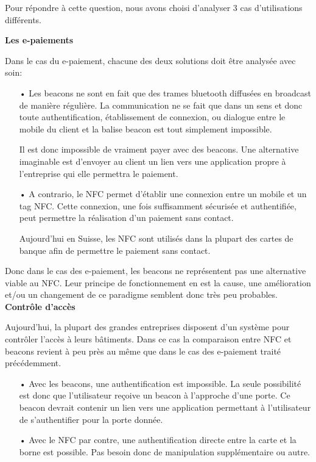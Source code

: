 \documentclass[12pt]{article}
\begin{document}
Pour répondre à cette question, nous avons choisi d'analyser 3 cas d'utilisations différents.

\textbf{Les e-paiements}\label{epaiement}
\medskip

Dans le cas du e-paiement, chacune des deux solutions doit être analysée avec soin:

\begin{enumerate}
\item[•] Les beacons ne sont en fait que des trames bluetooth diffusées en broadcast de manière régulière. La communication ne se fait que dans un sens et donc toute authentification, établissement de connexion, ou dialogue entre le mobile du client et la balise beacon est tout simplement impossible.

Il est donc impossible de vraiment payer avec des beacons. Une alternative imaginable est d'envoyer au client un lien vers une application propre à l'entreprise qui elle permettra le paiement. 

\item[•] A contrario, le NFC permet d'établir une connexion entre un mobile et un tag NFC. Cette connexion, une fois suffisamment sécurisée et authentifiée, peut permettre la réalisation d'un paiement sans contact. 

Aujourd'hui en Suisse, les NFC sont utilisés dans la plupart des cartes de banque afin de permettre le paiement sans contact.
\end{enumerate}

Donc dans le cas des e-paiement, les beacons ne représentent pas une alternative viable au NFC. Leur principe de fonctionnement en est la cause, une amélioration et/ou un changement de ce paradigme semblent donc très peu probables. \\

\textbf{Contrôle d'accès}
\medskip

Aujourd'hui, la plupart des grandes entreprises disposent d'un système pour contrôler l'accès à leurs bâtiments. Dans ce cas la comparaison entre NFC et beacons revient à peu près au même que dans le cas des e-paiement traité précédemment.

\begin{itemize}
\item[•] Avec les beacons, une authentification est impossible. La seule possibilité est donc que l'utilisateur reçoive un beacon à l'approche d'une porte. Ce beacon devrait contenir un lien vers une application permettant à l'utilisateur de s'authentifier pour la porte donnée.

\item[•] Avec le NFC par contre, une authentification directe entre la carte et la borne est possible. Pas besoin donc de manipulation supplémentaire ou autre.
\end{itemize}
\end{document}
